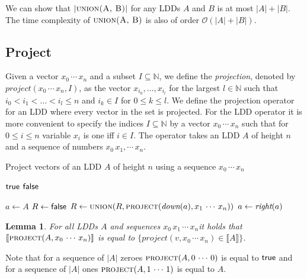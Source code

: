 \documentclass[a4paper]{article}
\newcommand{\var}[1]{\textit{#1}}
\newcommand{\interpret}[1]{\llbracket #1 \rrbracket}
\newtheorem{lemma}[theorem]{Lemma}
\begin{document}
We can show that $|\textsc{union(A, B)}|$ for any LDDs $A$ and $B$ is at most $|A| + |B|$.
The time complexity of $\textsc{union(A, B)}$ is also of order $\mathcal{O}(|A| + |B|)$.

\subsection{Project}

Given a vector $x_0\,\cdots\,x_n$ and a subset $I \subseteq \mathbb{N}$, we define the \emph{projection}, denoted by $\textit{project}(x_0\,\cdots\,x_n, I)$, as the vector $x_{i_0}, \ldots, x_{i_l}$ for the largest $l \in \mathbb{N}$ such that $i_0 < i_1 < \ldots < i_l \leq n$ and $i_k \in I$ for $0 \leq k \leq l$.
We define the projection operator for an LDD where every vector in the set is projected.
For the LDD operator it is more convenient to specify the indices $I \subseteq \mathbb{N}$ by a vector $x_0\,\cdots\,x_n$ such that for $0 \leq i \leq n$ variable $x_i$ is one iff $i \in I$.
The operator takes an LDD $A$ of height $n$ and a sequence of numbers $x_0\,x_1,\cdots\,x_n$.

\begin{algorithm}[h]
\caption{Project vectors of an LDD $\var{A}$ of height $n$ using a sequence $x_0\,\cdots\,x_n$}
\begin{algorithmic}[1]
		\State \Return $\textsf{true}$
		\State \Return $\textsf{false}$
	\EndIf
	
		\State {}
		\State $a \gets A$
		\State $R \gets \textsf{false}$
			\State $R \gets \textsc{union}(R, \textsc{project}(\textit{down}(a), x_1\,\cdots\,x_n))$
			\State $a \gets \textit{right}(a)$		
		\EndWhile			
		\State {}
	\EndIf

\EndFunction
\end{algorithmic}
\end{algorithm}

\begin{lemma}
	For all LDDs $A$ and sequences $x_0\,x_1\,\cdots\,x_n $it holds that $\interpret{\textsc{project}(A, x_0\,\cdots\,x_n)}$ is equal to $\{\textit{project}(v, x_0\,\cdots\,x_n) \in \interpret{A}\}$.
\end{lemma}

Note that for a sequence of $|A|$ zeroes $\textsc{project}(A, 0\,\cdots\,0)$ is equal to $\textsf{true}$ and for a sequence of $|A|$ ones $\textsc{project}(A, 1\,\cdots\,1)$ is equal to $A$.
\end{document}
